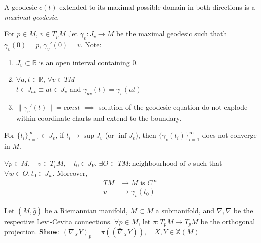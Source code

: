 \begin{definition}
    A geodesic $c(t)$ extended to its maximal possible domain in both directions is a \emph{maximal geodesic}.
    \label{def:7.8}
\end{definition}

For $p \in M$, $v \in T_p M$ ,let $\gamma_v : J_v \to M$ be the maximal geodesic such thath 
$\gamma_v(0) = p$, $\gamma_v'(0) = v$. Note:

\begin{enumerate}
    \item $J_v \subset \mathbb{R}$ is an open interval containing $0$.
    \item $\forall a,t \in \mathbb{R}$, $\forall v \in TM$ \\
    $t\in J_{av} \equiv at \in J_v$ and $\gamma_{av}(t) = \gamma_v(at)$
    \item $\|\gamma_v'(t)\| = const$ $\implies$ solution of the geodesic equation do not explode within coordinate charts and extend to the boundary.
\end{enumerate}

\begin{proposition}
    For $\{t_i\}_{i=1}^{\infty} \subset J_v$, if $t_i \to \sup{J_v}$ (or $\inf{J_v}$), 
    then  $\{\gamma_v(t_i)\}_{i=1}^{\infty}$ does not converge in $M$.
    \label{prop:7.9}
\end{proposition}

\begin{proposition}
    $\forall p \in M,\quad v \in T_pM, \quad t_0 \in J_V$,
    $\exists O \subset TM : \text{neighbourhood of } v$ such that $\forall w \in O, t_0 \in J_w$.
    Moreover, 
    \[
    \begin{aligned}
        TM &\to M \text{ is } C^{\infty} \\
        v &\to \gamma_v(t_0)
    \end{aligned}
    \]
    \label{prop:7.10}
\end{proposition}

\begin{problem}
    Let $(\bar{M}, \bar{g})$ be a Riemannian manifold, $M \subset \bar{M}$ a submanifold,
    and $\bar{\nabla}, \nabla$ be the respective Levi-Cevita connections.
    $\forall p \in M$, let $\pi: T_p \bar{M} \to T_pM$ be the orthogonal projection.
    \textbf{Show}: $(\nabla_X Y)_p = \pi ((\bar{\nabla}_X Y)), \quad X,Y \in \mathbb{X}(M)$
    \label{prob:11}
\end{problem}

